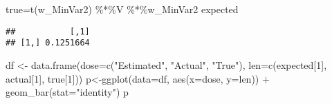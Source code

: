 \documentclass[
]{article}
\newenvironment{Shaded}{\begin{snugshade}}{\end{snugshade}}
\newcommand{\AttributeTok}[1]{\textcolor[rgb]{0.77,0.63,0.00}{#1}}
\newcommand{\CommentTok}[1]{\textcolor[rgb]{0.56,0.35,0.01}{\textit{#1}}}
\newcommand{\DecValTok}[1]{\textcolor[rgb]{0.00,0.00,0.81}{#1}}
\newcommand{\FunctionTok}[1]{\textcolor[rgb]{0.00,0.00,0.00}{#1}}
\newcommand{\NormalTok}[1]{#1}
\newcommand{\OtherTok}[1]{\textcolor[rgb]{0.56,0.35,0.01}{#1}}
\newcommand{\SpecialCharTok}[1]{\textcolor[rgb]{0.00,0.00,0.00}{#1}}
\newcommand{\StringTok}[1]{\textcolor[rgb]{0.31,0.60,0.02}{#1}}
\begin{document}
\begin{Shaded}
\end{Shaded}

\begin{Shaded}
\begin{Highlighting}[]
\NormalTok{true}\OtherTok{=}\FunctionTok{t}\NormalTok{(w\_MinVar2) }\SpecialCharTok{\%*\%}\NormalTok{V }\SpecialCharTok{\%*\%}\NormalTok{w\_MinVar2}
\NormalTok{expected}
\end{Highlighting}
\end{Shaded}

\begin{verbatim}
##           [,1]
## [1,] 0.1251664
\end{verbatim}

\begin{Shaded}
\begin{Highlighting}[]
\NormalTok{df }\OtherTok{\textless{}{-}} \FunctionTok{data.frame}\NormalTok{(}\AttributeTok{dose=}\FunctionTok{c}\NormalTok{(}\StringTok{"Estimated"}\NormalTok{, }\StringTok{"Actual"}\NormalTok{, }\StringTok{"True"}\NormalTok{),}
                \AttributeTok{len=}\FunctionTok{c}\NormalTok{(expected[}\DecValTok{1}\NormalTok{], actual[}\DecValTok{1}\NormalTok{], true[}\DecValTok{1}\NormalTok{]))}
\NormalTok{p}\OtherTok{\textless{}{-}}\FunctionTok{ggplot}\NormalTok{(}\AttributeTok{data=}\NormalTok{df, }\FunctionTok{aes}\NormalTok{(}\AttributeTok{x=}\NormalTok{dose, }\AttributeTok{y=}\NormalTok{len)) }\SpecialCharTok{+}
  \FunctionTok{geom\_bar}\NormalTok{(}\AttributeTok{stat=}\StringTok{"identity"}\NormalTok{)}
\NormalTok{p}
\end{Highlighting}
\end{Shaded}
\end{document}
